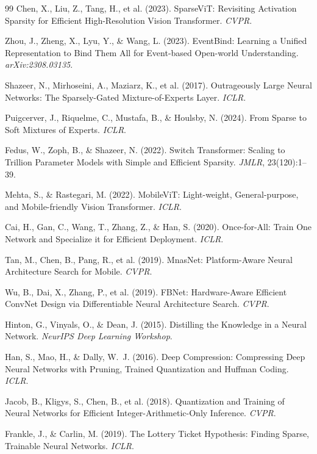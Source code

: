 \documentclass{article}
\begin{document}
{\begin{thebibliography}{99}
Chen, X., Liu, Z., Tang, H., et al. (2023). SparseViT: Revisiting Activation Sparsity for Efficient High-Resolution Vision Transformer. \emph{CVPR}.

Zhou, J., Zheng, X., Lyu, Y., \& Wang, L. (2023). EventBind: Learning a Unified Representation to Bind Them All for Event-based Open-world Understanding. \emph{arXiv:2308.03135}.

Shazeer, N., Mirhoseini, A., Maziarz, K., et al. (2017). Outrageously Large Neural Networks: The Sparsely-Gated Mixture-of-Experts Layer. \emph{ICLR}.

Puigcerver, J., Riquelme, C., Mustafa, B., \& Houlsby, N. (2024). From Sparse to Soft Mixtures of Experts. \emph{ICLR}.

Fedus, W., Zoph, B., \& Shazeer, N. (2022). Switch Transformer: Scaling to Trillion Parameter Models with Simple and Efficient Sparsity. \emph{JMLR}, 23(120):1--39.

Mehta, S., \& Rastegari, M. (2022). MobileViT: Light-weight, General-purpose, and Mobile-friendly Vision Transformer. \emph{ICLR}.

Cai, H., Gan, C., Wang, T., Zhang, Z., \& Han, S. (2020). Once-for-All: Train One Network and Specialize it for Efficient Deployment. \emph{ICLR}.

Tan, M., Chen, B., Pang, R., et al. (2019). MnasNet: Platform-Aware Neural Architecture Search for Mobile. \emph{CVPR}.

Wu, B., Dai, X., Zhang, P., et al. (2019). FBNet: Hardware-Aware Efficient ConvNet Design via Differentiable Neural Architecture Search. \emph{CVPR}.

Hinton, G., Vinyals, O., \& Dean, J. (2015). Distilling the Knowledge in a Neural Network. \emph{NeurIPS Deep Learning Workshop}.

Han, S., Mao, H., \& Dally, W.~J. (2016). Deep Compression: Compressing Deep Neural Networks with Pruning, Trained Quantization and Huffman Coding. \emph{ICLR}.

Jacob, B., Kligys, S., Chen, B., et al. (2018). Quantization and Training of Neural Networks for Efficient Integer-Arithmetic-Only Inference. \emph{CVPR}.

Frankle, J., \& Carlin, M. (2019). The Lottery Ticket Hypothesis: Finding Sparse, Trainable Neural Networks. \emph{ICLR}.


\end{thebibliography}}
\end{document}
